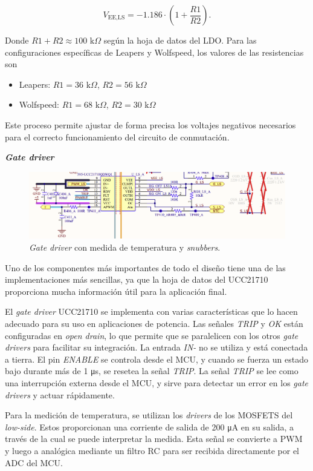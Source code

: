 \[ V_{\text{EE,LS}} = -1.186 \cdot \left(1 + \frac{R1}{R2}\right)  \text{.}\]

Donde \( R1 + R2 \approx 100 \text{ k}\Omega \) según la hoja de datos del LDO. Para las configuraciones específicas de Leapers y Wolfspeed, los valores de las resistencias son 

\begin{itemize}
	\item Leapers: \( R1 = 36 \text{ k}\Omega \), \( R2 = 56 \text{ k}\Omega \)
	\item Wolfspeed: \( R1 = 68 \text{ k}\Omega \), \( R2 = 30 \text{ k}\Omega \)
\end{itemize}

Este proceso permite ajustar de forma precisa los voltajes negativos necesarios para el correcto funcionamiento del circuito de conmutación.


\textbf{\textit{Gate driver}}
\begin{figure}[H]
	\centering
	\includegraphics[width=0.9\linewidth]{fig/GD-sch}
	\caption{\textit{Gate driver} con medida de temperatura y \textit{snubbers}.}
\end{figure}

Uno de los componentes más importantes de todo el diseño tiene una de las implementaciones más sencillas, ya que la hoja de datos del UCC21710 proporciona mucha información útil para la aplicación final.

El \textit{gate driver} UCC21710 se implementa con varias características que lo hacen adecuado para su uso en aplicaciones de potencia. Las señales \textit{TRIP} y \textit{OK} están configuradas en \textit{open drain}, lo que permite que se paralelicen con los otros \textit{gate drivers} para facilitar su integración. La entrada \textit{IN-} no se utiliza y está conectada a tierra. El pin \textit{ENABLE} se controla desde el MCU, y cuando se fuerza un estado bajo durante más de 1 \unit{\micro\second}, se resetea la señal \textit{TRIP}. La señal \textit{TRIP} se lee como una interrupción externa desde el MCU, y sirve para detectar un error en los \textit{gate drivers} y actuar rápidamente.

Para la medición de temperatura, se utilizan los \textit{drivers} de los MOSFETS del \textit{low-side}. Estos proporcionan una corriente de salida de 200 \unit{\micro\ampere} en su salida, a través de la cual se puede interpretar la medida. Esta señal se convierte a PWM y luego a analógica mediante un filtro RC para ser recibida directamente por el ADC del MCU. 

